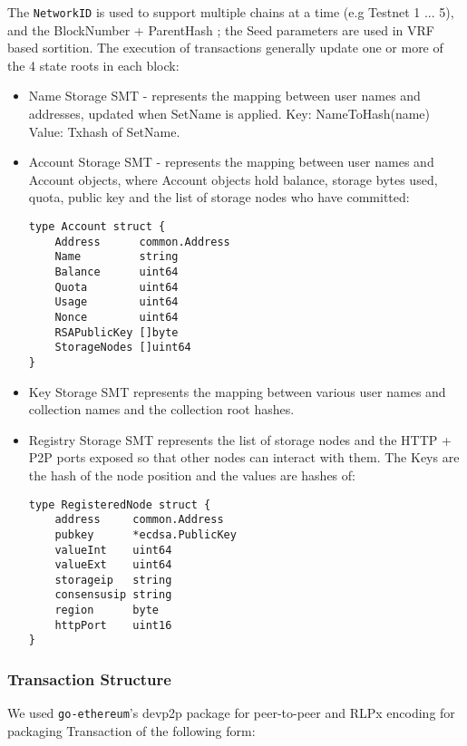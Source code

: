 \documentclass[journal]{IEEEtran}
\begin{document}
The {\tt NetworkID} is used to support multiple chains at a time (e.g Testnet 1 ... 5), and the BlockNumber + ParentHash ; the Seed parameters are used in VRF based sortition.  The execution of transactions generally update one or more of the 4 state roots in each block:
\begin{itemize}
    \item Name Storage SMT - represents the mapping between user names and addresses, updated when SetName is applied.  Key: NameToHash(name) Value: Txhash of SetName.
    \item Account Storage SMT - represents the mapping between user names and Account objects, where Account objects hold balance, storage bytes used, quota, public key and the list of storage nodes who have committed:
\begin{footnotesize}
\begin{verbatim}
type Account struct {
    Address      common.Address
    Name         string
    Balance      uint64
    Quota        uint64
    Usage        uint64
    Nonce        uint64
    RSAPublicKey []byte
    StorageNodes []uint64
}
\end{verbatim}
\end{footnotesize}

    \item Key Storage SMT represents the mapping between various user names and collection names and the collection root hashes.
    \item Registry Storage SMT represents the list of storage nodes and the HTTP + P2P ports exposed so that other nodes can interact with them.  The Keys are the hash of the node position and the values are hashes of:
\begin{footnotesize}
\begin{verbatim}
type RegisteredNode struct {
    address     common.Address
    pubkey      *ecdsa.PublicKey
    valueInt    uint64
    valueExt    uint64
    storageip   string
    consensusip string
    region      byte
    httpPort    uint16
}
\end{verbatim}
\end{footnotesize}
\end{itemize}

\subsubsection{Transaction Structure}

We used {\tt go-ethereum}'s devp2p package for peer-to-peer and RLPx encoding for packaging  Transaction of the following form:
\end{document}
